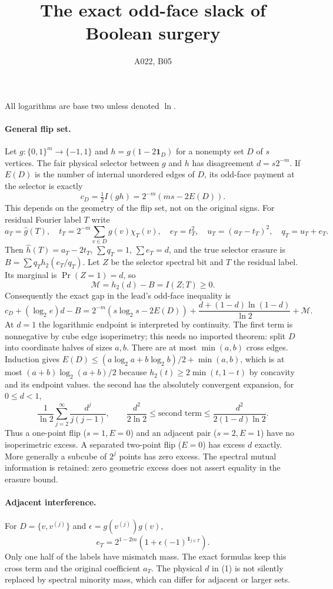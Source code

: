 \documentclass{article}
\begin{document}
\title{The exact odd-face slack of Boolean surgery}\author{A022, B05}\maketitle
All logarithms are base two unless denoted $\ln$.

\paragraph{General flip set.}
Let $g:\{0,1\}^m\to\{-1,1\}$ and
$h=g(1-2\mathbf1_D)$ for a nonempty set $D$ of $s$ vertices.
The fair physical selector between $g$ and $h$ has disagreement
$d=s2^{-m}$. If $E(D)$ is the number of internal unordered edges of
$D$, its odd-face payment at the selector is exactly
\[
c_D=\tfrac12 I(gh)=2^{-m}(ms-2E(D)).
\]
This depends on the geometry of the flip set, not on the original signs.
For residual Fourier label $T$ write
\[
a_T=\widehat g(T),\quad t_T=2^{-m}\sum_{v\in D}g(v)\chi_T(v),
\quad e_T=t_T^2,\quad u_T=(a_T-t_T)^2,\quad q_T=u_T+e_T.
\]
Then $\widehat h(T)=a_T-2t_T$, $\sum q_T=1$, $\sum e_T=d$,
and the true selector erasure is $B=\sum q_Th_2(e_T/q_T)$.
Let $Z$ be the selector spectral bit and $T$ the residual label.
Its marginal is $\Pr(Z=1)=d$, so
\[
\mathcal M=h_2(d)-B=I(Z;T)\ge0.
\]
Consequently the exact gap in the lead's odd-face inequality is
\[
\boxed{c_D+(\log_2 e)d-B
=2^{-m}(s\log_2s-2E(D))
+\frac{d+(1-d)\ln(1-d)}{\ln2}+\mathcal M.} \tag{1}
\]
At $d=1$ the logarithmic endpoint is interpreted by continuity.
The first term is nonnegative by cube edge isoperimetry;
this needs no imported theorem: split $D$ into coordinate halves
of sizes $a,b$. There are at most $\min(a,b)$ cross edges.
Induction gives $E(D)\le(a\log_2a+b\log_2b)/2+\min(a,b)$,
which is at most $(a+b)\log_2(a+b)/2$ because
$h_2(t)\ge2\min(t,1-t)$ by concavity and its endpoint values.
the second has the absolutely convergent expansion, for $0\le d<1$,
\[
\frac1{\ln2}\sum_{j=2}^{\infty}\frac{d^j}{j(j-1)},
\qquad \frac{d^2}{2\ln2}\le\text{second term}
\le\frac{d^2}{2(1-d)\ln2}.
\]
Thus a one-point flip ($s=1,E=0$) and an adjacent pair
($s=2,E=1$) have no isoperimetric excess.
A separated two-point flip ($E=0$) has excess $d$ exactly.
More generally a subcube of $2^j$ points has zero excess.
The spectral mutual information is retained: zero geometric excess
does not assert equality in the erasure bound.

\paragraph{Adjacent interference.}
For $D=\{v,v^{(j)}\}$ and $\epsilon=g(v^{(j)})g(v)$,
\[
e_T=2^{1-2m}(1+\epsilon(-1)^{\mathbf1_{j\in T}}).
\]
Only one half of the labels have mismatch mass. The exact formulas
keep this cross term and the original coefficient $a_T$.
The physical $d$ in (1) is not silently replaced by spectral
minority mass, which can differ for adjacent or larger sets.
\end{document}
